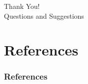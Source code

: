 \documentclass[aspectratio=1610]{beamer}
\begin{document}
%
%
%
%
%
%
%
%
%
%
%
%
%
%
%
%















\section{}
\begin{frame}
\begin{center}
\Huge Thank You! \\
\Huge Questions and Suggestions
\end{center}

\end{frame}







%        
%        

\section*{References}
\begin{frame}[allowframebreaks]
        \frametitle{References}
        
        
\end{frame}
\end{document}
